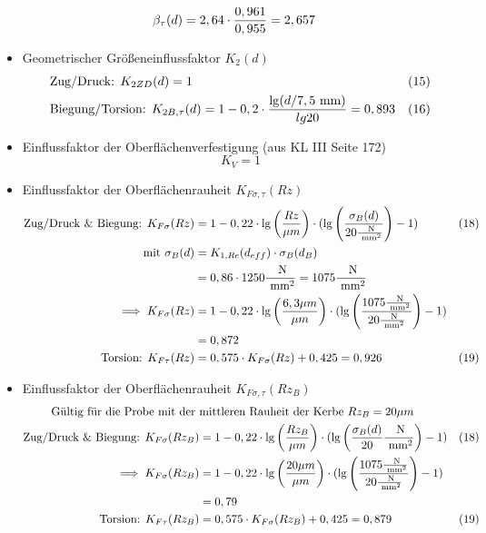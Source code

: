 \begin{itemize}
\begin{align*}
	&\beta_{ \tau} (d)= 2,64 \cdot \frac{0,961}{0,955}  =2,657
	\end{align*}
\item Geometrischer Größeneinflussfaktor $K_2 (d)$ 
	\begin{align*}
	&\text{Zug/Druck: }K_{2ZD} (d) = 1 & (15) \\
	&\text{Biegung/Torsion: } K_{2B,\tau} (d) = 1 -0,2 \cdot  \frac{\lg (d / 7,5 \text{ mm})}{lg 20}  = 0,893 &(16) 
	\end{align*}
\item Einflussfaktor der Oberflächenverfestigung (aus KL III  Seite 172)
	\[
	K_{V} = 1
	\]
\item Einflussfaktor der Oberflächenrauheit $K_{F\sigma, \tau} (Rz)$
	\begin{align*}
	\text{Zug/Druck \& Biegung: } K_{F\sigma} (Rz)&= 1 - 0,22 \cdot \lg \left( \frac{Rz}{\mu m}\right) \cdot ( \lg \left( \frac{\sigma_B (d)}{20\frac{\text{ N}}{\text{ mm}^2}}\right) -1 ) &(18) \\
	\text{mit } \sigma_B (d) &= K_{1,Re} (d_{eff}) \cdot \sigma_B (d_B) \\
	&= 0,86 \cdot 1250\frac{\text{ N}}{\text{ mm}^2} = 1075 \frac{\text{ N}}{\text{ mm}^2} \\
	\implies K_{F\sigma} (Rz) & = 1 - 0,22 \cdot \lg \left( \frac{6,3 \mu m}{\mu m}\right) \cdot ( \lg \left( \frac{1075\frac{\text{ N}}{\text{ mm}^2} }{20\frac{\text{ N}}{\text{ mm}^2}}\right) -1 ) \\
	 &= 0,872 \\
	\text{Torsion: } K_{F\tau} (Rz)&= 0,575 \cdot K_{F\sigma} (Rz) +0,425 = 0,926 & (19) 
	\end{align*}
\item Einflussfaktor der Oberflächenrauheit $K_{F\sigma, \tau} (Rz_B)$
	\begin{align*}
	\text{Gültig für die Probe mit der } &\text{mittleren Rauheit der Kerbe } Rz_B= 20 \mu m\\
	\text{Zug/Druck \& Biegung: } K_{F\sigma} (Rz_B)&= 1 - 0,22 \x \lg \left( \frac{Rz_B}{\mu m}\right) \x ( \lg \left( \frac{\sigma_B (d)}{20}\frac{\text{ N}}{\text{ mm}^2}\right) -1 ) &(18) \\
	\implies K_{F\sigma} (Rz_B) & = 1 - 0,22 \x \lg \left( \frac{20 \mu m}{\mu m}\right) \x ( \lg \left( \frac{1075\frac{\text{ N}}{\text{ mm}^2} }{20\frac{\text{ N}}{\text{ mm}^2}}\right) -1 )\\
	&= 0,79 \\
	\text{Torsion: } K_{F\tau} (Rz_B)&= 0,575 \x K_{F\sigma} (Rz_B) +0,425 = 0,879 & (19) 

\end{align*}
\end{itemize}
